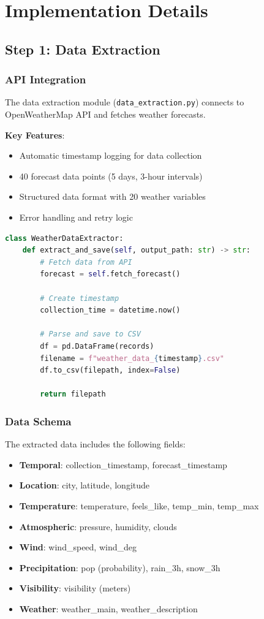 \documentclass[12pt,a4paper]{article}
\begin{document}
\section{Implementation Details}

\subsection{Step 1: Data Extraction}

\subsubsection{API Integration}
The data extraction module (\texttt{data\_extraction.py}) connects to OpenWeatherMap API and fetches weather forecasts.

\textbf{Key Features}:
\begin{itemize}
    \item Automatic timestamp logging for data collection
    \item 40 forecast data points (5 days, 3-hour intervals)
    \item Structured data format with 20 weather variables
    \item Error handling and retry logic
\end{itemize}

\begin{lstlisting}[language=Python, caption=Data Extraction Example]
class WeatherDataExtractor:
    def extract_and_save(self, output_path: str) -> str:
        # Fetch data from API
        forecast = self.fetch_forecast()
        
        # Create timestamp
        collection_time = datetime.now()
        
        # Parse and save to CSV
        df = pd.DataFrame(records)
        filename = f"weather_data_{timestamp}.csv"
        df.to_csv(filepath, index=False)
        
        return filepath
\end{lstlisting}

\subsubsection{Data Schema}

The extracted data includes the following fields:
\begin{itemize}
    \item \textbf{Temporal}: collection\_timestamp, forecast\_timestamp
    \item \textbf{Location}: city, latitude, longitude
    \item \textbf{Temperature}: temperature, feels\_like, temp\_min, temp\_max
    \item \textbf{Atmospheric}: pressure, humidity, clouds
    \item \textbf{Wind}: wind\_speed, wind\_deg
    \item \textbf{Precipitation}: pop (probability), rain\_3h, snow\_3h
    \item \textbf{Visibility}: visibility (meters)
    \item \textbf{Weather}: weather\_main, weather\_description
\end{itemize}
\end{document}
